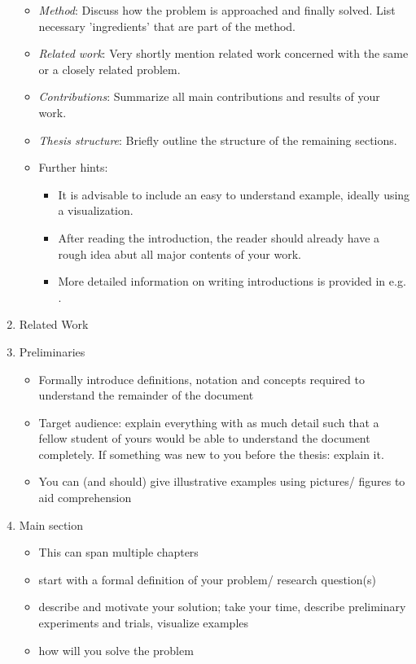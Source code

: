 \documentclass[twocolumn]{mlai-guide}
\begin{document}
\begin{enumerate}
\begin{itemize}
			\item \emph{Method}: Discuss how the problem is approached and finally solved. List necessary 'ingredients' that are part of the method. 
			\item \emph{Related work}: Very shortly mention related work concerned with the same or a closely related problem.
			\item \emph{Contributions}: Summarize all main contributions and results of your work. 
			\item \emph{Thesis structure}: Briefly outline the structure of the remaining sections. 
			\item Further hints:
			\begin{itemize}
				\item It is advisable to include an easy to understand example, ideally using a visualization. 
				\item After reading the introduction, the reader should already have a rough idea abut all major contents of your work.
				\item More detailed information on writing introductions is provided in e.g. \cite{zobel_writing}.
			\end{itemize}
		\end{itemize}
	\item Related Work
	\item Preliminaries
		\begin{itemize}
			\item Formally introduce definitions, notation and concepts required to understand the remainder of the document
			\item Target audience: explain everything with as much detail such that a fellow student of yours would be able to understand the document completely. If something was new to you before the thesis: explain it.
			\item You can (and should) give illustrative examples using pictures/ figures to aid comprehension
		\end{itemize}
	\item Main section
		\begin{itemize}
			\item This can span multiple chapters
			\item start with a formal definition of your problem/ research question(s)
			\item describe and motivate your solution; take your time, describe preliminary experiments and trials, visualize examples
			\item how will you solve the problem

\end{itemize}
\end{enumerate}
\end{document}
